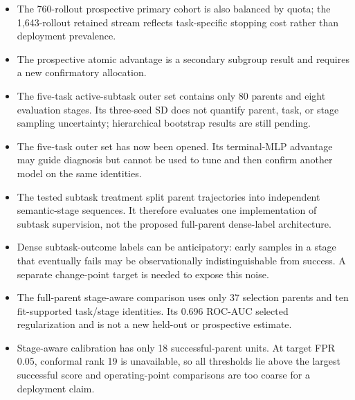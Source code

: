 \documentclass[11pt,a4paper]{article}
\begin{document}
\begin{itemize}
\item The 760-rollout prospective primary cohort is also balanced by quota;
the 1,643-rollout retained stream reflects task-specific stopping cost rather
than deployment prevalence.
\item The prospective atomic advantage is a secondary subgroup result and
requires a new confirmatory allocation.
\item The five-task active-subtask outer set contains only 80 parents and eight
evaluation stages. Its three-seed SD does not quantify parent, task, or stage
sampling uncertainty; hierarchical bootstrap results are still pending.
\item The five-task outer set has now been opened. Its terminal-MLP advantage
may guide diagnosis but cannot be used to tune and then confirm another model
on the same identities.
\item The tested subtask treatment split parent trajectories into independent
semantic-stage sequences. It therefore evaluates one implementation of
subtask supervision, not the proposed full-parent dense-label architecture.
\item Dense subtask-outcome labels can be anticipatory: early samples in a
stage that eventually fails may be observationally indistinguishable from
success. A separate change-point target is needed to expose this noise.
\item The full-parent stage-aware comparison uses only 37 selection parents
and ten fit-supported task/stage identities. Its 0.696 ROC-AUC selected
regularization and is not a new held-out or prospective estimate.
\item Stage-aware calibration has only 18 successful-parent units. At target
FPR 0.05, conformal rank 19 is unavailable, so all thresholds lie above the
largest successful score and operating-point comparisons are too coarse for a
deployment claim.
\end{itemize}

\appendix
\end{document}
